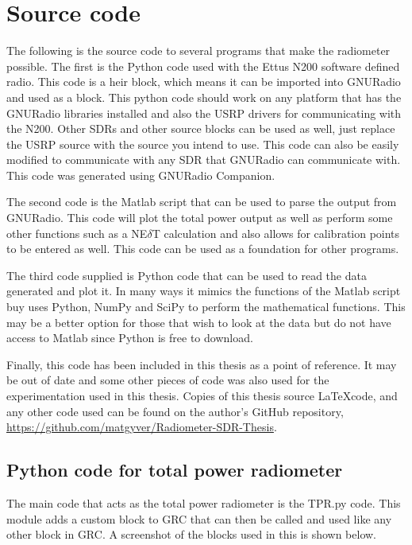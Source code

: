 \appendixtitle
\appendix
\chapter{Source code}

The following is the source code to several programs that make the radiometer possible.  The first is the Python code used with the Ettus N200 software defined radio.  This code is a heir block, which means it can be imported into GNURadio and used as a block.  This python code should work on any platform that has the GNURadio libraries installed and also the USRP drivers for communicating with the N200.  Other SDRs and other source blocks can be used as well, just replace the USRP source with the source you intend to use.  This code can also be easily modified to communicate with any SDR that GNURadio can communicate with.  This code was generated using GNURadio Companion.  

The second code is the Matlab script that can be used to parse the output from GNURadio.  This code will plot the total power output as well as perform some other functions such as a NE$\delta$T calculation and also allows for calibration points to be entered as well.  This code can be used as a foundation for other programs.  

The third code supplied is Python code that can be used to read the data generated and plot it.  In many ways it mimics the functions of the Matlab script buy uses Python, NumPy and SciPy to perform the mathematical functions.  This may be a better option for those that wish to look at the data but do not have access to Matlab since Python is free to download.

Finally, this code has been included in this thesis as a point of reference.  It may be out of date and some other pieces of code was also used for the experimentation used in this thesis.  Copies of this thesis source \LaTeX code, and any other code used can be found on the author's GitHub repository, \url{https://github.com/matgyver/Radiometer-SDR-Thesis}.


\section*{Python code for total power radiometer}
The main code that acts as the total power radiometer is the TPR.py code.  This module adds a custom block to GRC that can then be called and used like any other block in GRC.  A screenshot of the blocks used in this is shown below.


